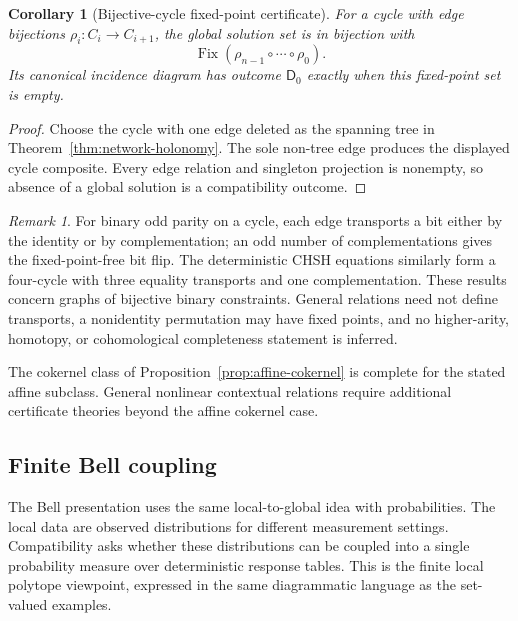 \documentclass[11pt]{article}
\theoremstyle{plain}
\newtheorem{corollary}[theorem]{Corollary}
\theoremstyle{definition}
\theoremstyle{remark}
\newtheorem{remark}[theorem]{Remark}
\begin{document}
\begin{corollary}[Bijective-cycle fixed-point certificate]
\label{cor:cycle-holonomy}
For a cycle with edge bijections
$\rho_i:C_i\to C_{i+1}$, the global solution set is in bijection with
\[
\operatorname{Fix}(\rho_{n-1}\circ\cdots\circ\rho_0).
\]
Its canonical incidence diagram has outcome $\mathsf D_0$ exactly when this
fixed-point set is empty.
\end{corollary}

\begin{proof}
Choose the cycle with one edge deleted as the spanning tree in
Theorem~\ref{thm:network-holonomy}. The sole non-tree edge produces the displayed
cycle composite. Every edge relation and singleton projection is nonempty, so
absence of a global solution is a compatibility outcome.
\end{proof}

\begin{remark}
For binary odd parity on a cycle, each edge transports a bit either by the
identity or by complementation; an odd number of complementations gives the
fixed-point-free bit flip. The deterministic CHSH equations similarly form a
four-cycle with three equality transports and one complementation. These results
concern graphs of bijective binary constraints. General relations need not
define transports, a nonidentity permutation may have fixed points, and no
higher-arity, homotopy, or cohomological completeness statement is inferred.
\end{remark}

The cokernel class of Proposition~\ref{prop:affine-cokernel} is complete for the
stated affine subclass. General nonlinear contextual relations require
additional certificate theories beyond the affine cokernel case.

\subsection{Finite Bell coupling}

The Bell presentation uses the same local-to-global idea with probabilities.
The local data are observed distributions for different measurement settings.
Compatibility asks whether these distributions can be coupled into a single
probability measure over deterministic response tables. This is the finite local
polytope viewpoint, expressed in the same diagrammatic language as the set-valued
examples.
\end{document}

